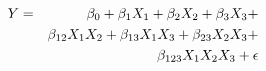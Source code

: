 \documentclass[12pt]{article}
\begin{document}
\pagestyle{empty}
\Large
{}
\pagecolor{ehandbook}

\boldmath
\begin{eqnarray*}
\hspace*{-1.25in}
Y &=& \beta_0 + \beta_1 X_1 + \beta_2 X_2 + \beta_3 X_3 + \\
    & &  \beta_{12} X_1 X_2 + \beta_{13} X_1 X_3 + \beta_{23} X_2 X_3 + \\
     & & \beta_{123} X_1 X_2 X_3 + \epsilon
\end{eqnarray*}
\end{document}

